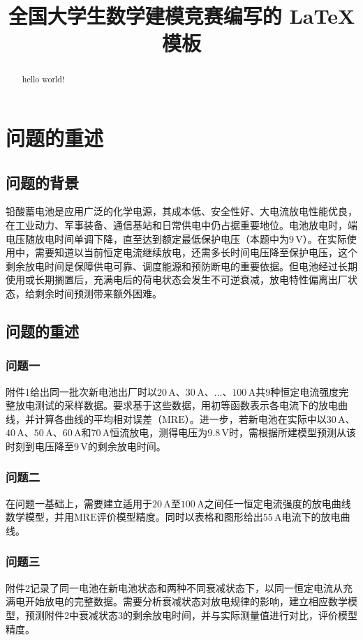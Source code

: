 \documentclass[withoutpreface,bwprint]{cumcmthesis} %
\title{全国大学生数学建模竞赛编写的 \LaTeX{} 模板}
\begin{document}
 \maketitle
 \begin{abstract}
 hello world!
\end{abstract}


\section{问题的重述}
\subsection{问题的背景}
    铅酸蓄电池是应用广泛的化学电源，其成本低、安全性好、大电流放电性能优良，在工业动力、军事装备、通信基站和日常供电中仍占据重要地位。电池放电时，端电压随放电时间单调下降，直至达到额定最低保护电压（本题中为$9\,\text{V}$）。在实际使用中，需要知道以当前恒定电流继续放电，还需多长时间电压降至保护电压，这个剩余放电时间是保障供电可靠、调度能源和预防断电的重要依据。但电池经过长期使用或长期搁置后，充满电后的荷电状态会发生不可逆衰减，放电特性偏离出厂状态，给剩余时间预测带来额外困难。
    \subsection{问题的重述}
        \subsubsection{问题一}
        附件1给出同一批次新电池出厂时以$20\,\text{A}$、$30\,\text{A}$、$\dots$、$100\,\text{A}$共9种恒定电流强度完整放电测试的采样数据。要求基于这些数据，用初等函数表示各电流下的放电曲线，并计算各曲线的平均相对误差（$\text{MRE}$）。进一步，若新电池在实际中以$30\,\text{A}$、$40\,\text{A}$、$50\,\text{A}$、$60\,\text{A}$和$70\,\text{A}$恒流放电，测得电压为$9.8\,\text{V}$时，需根据所建模型预测从该时刻到电压降至$9\,\text{V}$的剩余放电时间。
        \subsubsection{问题二}
        在问题一基础上，需要建立适用于$20\,\text{A}$至$100\,\text{A}$之间任一恒定电流强度的放电曲线数学模型，并用$\text{MRE}$评价模型精度。同时以表格和图形给出$55\,\text{A}$电流下的放电曲线。
        \subsubsection{问题三}
        附件2记录了同一电池在新电池状态和两种不同衰减状态下，以同一恒定电流从充满电开始放电的完整数据。需要分析衰减状态对放电规律的影响，建立相应数学模型，预测附件2中衰减状态3的剩余放电时间，并与实际测量值进行对比，评价模型精度。
\end{document}
